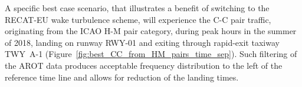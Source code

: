 A specific best case scenario, that illustrates a benefit of switching to the RECAT-EU wake turbulence scheme, will experience the C-C pair traffic, originating from the ICAO H-M pair category, during peak hours in the summer of 2018, landing on runway RWY-01 and exiting through rapid-exit taxiway TWY~A-1 (Figure~\ref{fig:best_CC_from_HM_pairs_time_sep}). Such filtering of the AROT data produces acceptable frequency distribution to the left of the reference time line and allows for reduction of the landing times.
\begin{figure}[h]
    \centering
    
    

\end{figure}
